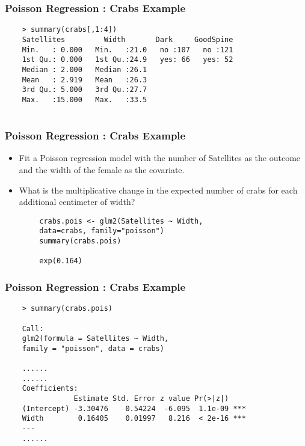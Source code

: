 \documentclass[MASTER.tex]{subfiles}
\begin{document}
\begin{frame}[fragile]
	\frametitle{Poisson Regression :  Crabs Example}
	\begin{verbatim}
	> summary(crabs[,1:4])
	Satellites         Width       Dark     GoodSpine
	Min.   : 0.000   Min.   :21.0   no :107   no :121  
	1st Qu.: 0.000   1st Qu.:24.9   yes: 66   yes: 52  
	Median : 2.000   Median :26.1                      
	Mean   : 2.919   Mean   :26.3                      
	3rd Qu.: 5.000   3rd Qu.:27.7                      
	Max.   :15.000   Max.   :33.5                
	
	\end{verbatim}
\end{frame}
\begin{frame}[fragile]
	\frametitle{Poisson Regression :  Crabs Example}
	\begin{itemize}
		\item Fit a Poisson regression model with the number of Satellites as the outcome and the width of the female as the covariate. 
		
		\item What is the multiplicative change in the expected number of crabs for each additional centimeter of width?
	\end{itemize}
	\begin{framed}
		\begin{verbatim}
		crabs.pois <- glm2(Satellites ~ Width, 
		data=crabs, family="poisson")
		summary(crabs.pois)
		
		exp(0.164)
		\end{verbatim}
	\end{framed}
	
\end{frame}
\begin{frame}[fragile]
	\frametitle{Poisson Regression :  Crabs Example}
	\begin{verbatim}
	> summary(crabs.pois)
	
	Call:
	glm2(formula = Satellites ~ Width, 
	family = "poisson", data = crabs)
	
	...... 
	......
	Coefficients:
	            Estimate Std. Error z value Pr(>|z|)    
	(Intercept) -3.30476    0.54224  -6.095  1.1e-09 ***
	Width        0.16405    0.01997   8.216  < 2e-16 ***
	---
	...... 
	\end{verbatim}
	
\end{frame}
\end{document}
